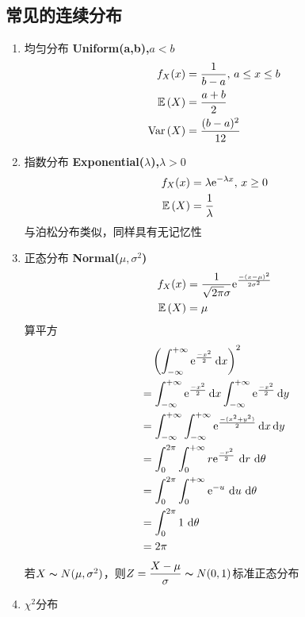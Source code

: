 \subsection{常见的连续分布}
\begin{enumerate}
	\item 均匀分布 \textbf{Uniform(a,b),$a<b$}
	\[\begin{aligned}
	f_X(x)&=\dfrac{1}{b-a},\,a\leq x\leq b\\
	\E{X}&=\dfrac{a+b}{2}\\
	\Var{X}&=\dfrac{(b-a)^2}{12}
	\end{aligned}\]
	\item 指数分布 \textbf{Exponential($\lambda$),$\lambda>0$}
	\[\begin{aligned}
	f_X(x)&=\lambda\ee^{-\lambda x},\,x\geq 0\\
	\E{X}&=\dfrac{1}{\lambda}
	\end{aligned}\]
	与泊松分布类似，同样具有无记忆性
	\item 正态分布 \textbf{Normal($\mu,\sigma^2$)}
	\[\begin{aligned}
	f_X(x)&=\dfrac{1}{\sqrt{2\pi}\sigma}\ee^\frac{-(x-\mu)^2}{2\sigma^2}\\
	\E{X}&=\mu
	\end{aligned}\]
	算平方
	\[\begin{aligned}
	&\quad\left(\intinf{\ee^\frac{-x^2}{2}}\right)^2\\
	&=\intinf{\ee^\frac{-x^2}{2}}\intinf[y]{\ee^\frac{-x^2}{2}}\\
	&=\intinf[y]{\intinf{\ee^\frac{-(x^2+y^2)}{2}}}\\
	&=\intabu{0}{2\pi}{\intabu{0}{+\infty}{r\ee^\frac{-r^2}{2}}{r}}{\theta}\\
	&=\intabu{0}{2\pi}{\intabu{0}{+\infty}{\ee^{-u}}{u}}{\theta}\\
	&=\intabu{0}{2\pi}{1}{\theta}\\
	&=2\pi
	\end{aligned}\]
	若$X\thicksim N(\mu,\sigma^2)$，则$Z=\dfrac{X-\mu}{\sigma}\thicksim N(0,1)$标准正态分布
	\item $\chi^2$分布
\end{enumerate}